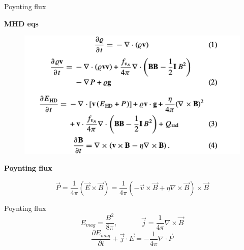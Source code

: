 \documentclass{beamer}
\begin{document}
\newcommand{\tikzAngleOfLine}{\tikz@AngleOfLine}
  \def\tikz@AngleOfLine(#1)(#2)#3{%
  \pgfmathanglebetweenpoints{%
    \pgfpointanchor{#1}{center}}{%
    \pgfpointanchor{#2}{center}}
  \pgfmathsetmacro{#3}{\pgfmathresult}%
  }



\begin{frame}{Poynting flux}

\bf{MHD eqs} 
 
\begin{figure}[H]
 \centering
 \includegraphics[scale=0.5]{eqs.png}
\end{figure}

\bf{Poynting flux} 

\begin{equation}
\vec{P} = \frac{1}{4 \pi} \left ( \vec{E} \times \vec{B}  \right ) = \frac{1}{4 \pi} 
 (- \vec{v} \times \vec{B}  + \eta \nabla \times \vec{B}) \times \vec{B}
\end{equation}

\end{frame}

\begin{frame}{Poynting flux}
\begin{equation}
E_{mag} = \frac{B^2}{8 \pi} , \;\;\;\; \;\;\;\; \;\;\;\;  \vec{j} = \frac{1}{4 \pi} \nabla \times \vec{B}
\end{equation}
\begin{equation}
\frac{\partial E_{mag}}{\partial t} + \vec{j} \cdot \vec{E} = -\frac{1}{4 \pi} \nabla \cdot \vec{P}
\end{equation}

\end{frame}
\end{document}
